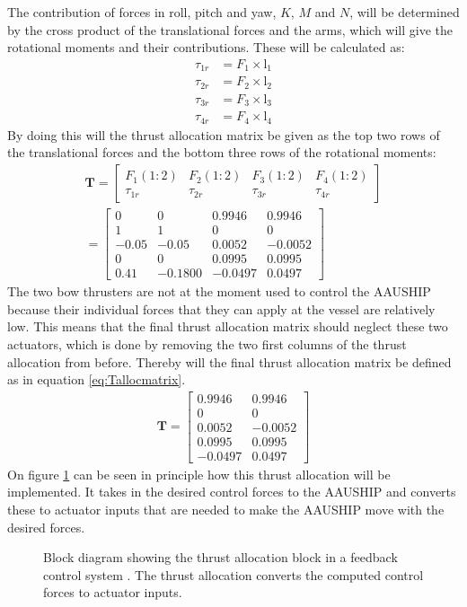 The contribution of forces in roll, pitch and yaw, $K$, $M$ and $N$, will be determined by the cross product of the translational forces and the arms, which will give the rotational moments and their contributions. These will be calculated as:
\begin{align}
\tau_{1r} &= F_1\times \text{l}_1\\
\tau_{2r} &= F_2\times \text{l}_2\\
\tau_{3r} &= F_3\times \text{l}_3\\
\tau_{4r} &= F_4\times \text{l}_4
\end{align}
By doing this will the thrust allocation matrix be given as the top two rows of the translational forces and the bottom three rows of the rotational moments:
\begin{align}
\mathbf{T} =
\begin{bmatrix}
F_1(1:2) & F_2(1:2) & F_3(1:2) & F_4(1:2) \\
\tau_{1r} & \tau_{2r} & \tau_{3r} & \tau_{4r}
\end{bmatrix}\\
=
\begin{bmatrix}
0 & 0 & 0.9946 & 0.9946 \\
1 & 1 & 0 & 0 \\
-0.05 & -0.05 & 0.0052 & -0.0052 \\
0 & 0 & 0.0995 & 0.0995 \\
0.41 & -0.1800 & -0.0497 & 0.0497
\end{bmatrix}
\end{align}
The two bow thrusters are not at the moment used to control the AAUSHIP because their individual forces that they can apply at the vessel are relatively low. This means that the final thrust allocation matrix should neglect these two actuators, which is done by removing the two first columns of the thrust allocation from before. Thereby will the final thrust allocation matrix be defined as in equation \ref{eq:Tallocmatrix}.
\begin{align}
\mathbf{T} =
\begin{bmatrix}
0.9946 & 0.9946 \\
0 & 0 \\
0.0052 & -0.0052 \\
0.0995 & 0.0995 \\
-0.0497 & 0.0497
\end{bmatrix}
\label{eq:Tallocmatrix}
\end{align}
On figure \ref{fig:thrust_allocation_block} can be seen in principle how this thrust allocation will be implemented. It takes in the desired control forces to the AAUSHIP and converts these to actuator inputs that are needed to make the AAUSHIP move with the desired forces.
\begin{figure}[htbp]
\centering

\caption{Block diagram showing the thrust allocation block in a
feedback control system \citep[fig.12.25]{fossen}. The thrust
allocation converts the computed control forces to actuator inputs.}
\label{fig:thrust_allocation_block}
\end{figure}